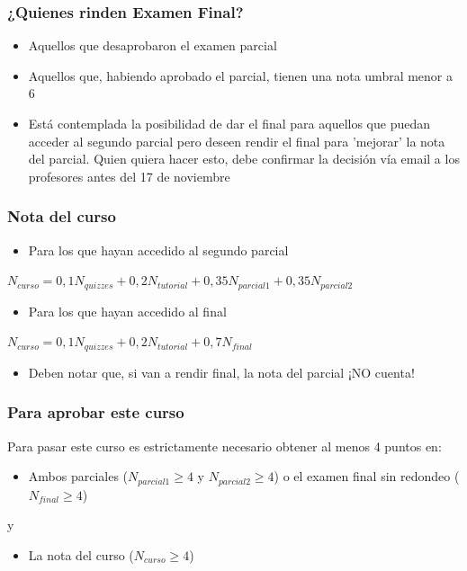 \documentclass{beamer}
\begin{document}
\begin{frame}
\frametitle{¿Quienes rinden Examen Final?} 
\begin{itemize}
    \item Aquellos que desaprobaron el examen parcial \vspace{2mm}
    \item Aquellos que, habiendo aprobado el parcial, tienen una nota umbral menor a 6 \vspace{2mm}
    \item Está contemplada la posibilidad de dar el final para aquellos que puedan acceder al segundo parcial pero deseen rendir el final para 'mejorar' la nota del parcial. Quien quiera hacer esto, debe confirmar la decisión vía email a los profesores antes del 17 de noviembre
\end{itemize}
\end{frame}

\begin{frame}
\frametitle{Nota del curso}
\small
\begin{itemize}
    \item Para los que hayan accedido al segundo parcial \\
\end{itemize}
\begin{center}
    {$N_{curso}=0,1N_{quizzes}+0,2N_{tutorial}+0,35N_{parcial 1}+0,35N_{parcial 2}$}
\end{center} \vspace{2mm}
\begin{itemize}
    \item Para los que hayan accedido al final
\end{itemize} 
\begin{center}
    {$N_{curso}=0,1N_{quizzes}+0,2N_{tutorial}+0,7N_{final}$}
\end{center} \vspace{2mm}
\begin{itemize}    
    \item Deben notar que, si van a rendir final, la nota del parcial ¡NO cuenta!
\end{itemize}
\end{frame}

\begin{frame}
\frametitle{Para aprobar este curso}
Para pasar este curso es estrictamente necesario obtener al menos 4 puntos en:
\vspace{2mm}
\begin{itemize}
    \item Ambos parciales ($N_{parcial 1} \geq 4$ y $N_{parcial 2} \geq 4$) o el examen final sin redondeo ($N_{final} \geq 4$)
\end{itemize}
\centering y
\vspace{2mm}
\begin{itemize}
    \item La nota del curso ($N_{curso} \geq 4$)
\end{itemize}
\end{frame}
\end{document}
